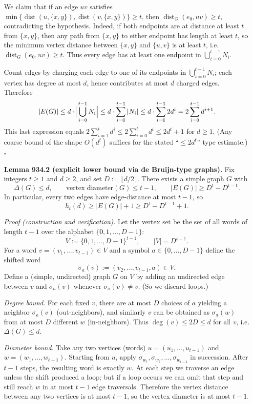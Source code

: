 We claim that if an edge $uv$ satisfies $\min\{\operatorname{dist}(u,\{x,y\}),\operatorname{dist}(v,\{x,y\})\}\ge t$, then $\operatorname{dist}_G(e_0,uv)\ge t$, contradicting the hypothesis.
Indeed, if both endpoints are at distance at least $t$ from $\{x,y\}$, then any path from $\{x,y\}$ to either endpoint has length at least $t$, so the minimum vertex distance between $\{x,y\}$ and $\{u,v\}$ is at least $t$, i.e. $\operatorname{dist}_G(e_0,uv)\ge t$.
Thus every edge has at least one endpoint in $\bigcup_{i=0}^{t-1} N_i$.

Count edges by charging each edge to one of its endpoints in $\bigcup_{i=0}^{t-1} N_i$; each vertex has degree at most $d$, hence contributes at most $d$ charged edges. Therefore
\[
|E(G)|\le d\cdot\Bigl|\bigcup_{i=0}^{t-1} N_i\Bigr|\le d\cdot\sum_{i=0}^{t-1} |N_i|\le d\cdot\sum_{i=0}^{t-1} 2d^i = 2\sum_{i=0}^{t-1} d^{i+1}.
\]
This last expression equals $2\sum_{i=1}^{t} d^{i}\le 2\sum_{i=0}^{t} d^{i}\le 2d^t+1$ for $d\ge 1$.
(Any coarse bound of the shape $O(d^t)$ suffices for the stated ``$\le 2d^t$'' type estimate.)
\hfill$\square$

\medskip
\textbf{Lemma 934.2 (explicit lower bound via de Bruijn-type graphs).}
Fix integers $t\ge 1$ and $d\ge 2$, and set $D:=\lfloor d/2\rfloor$.
There exists a simple graph $G$ with
\[
\Delta(G)\le d,\qquad \text{vertex diameter}(G)\le t-1,\qquad |E(G)|\ge D^t - D^{t-1}.
\]
In particular, every two edges have edge-distance at most $t-1$, so
\[
 h_t(d)\ge |E(G)|+1\ge D^t-D^{t-1}+1.
\]

\emph{Proof (construction and verification).}
Let the vertex set be the set of all words of length $t-1$ over the alphabet $\{0,1,\dots,D-1\}$:
\[
V:=\{0,1,\dots,D-1\}^{t-1},\qquad |V|=D^{t-1}.
\]
For a word $v=(v_1,\dots,v_{t-1})\in V$ and a symbol $a\in\{0,\dots,D-1\}$ define the shifted word
\[
\sigma_a(v):=(v_2,\dots,v_{t-1},a)\in V.
\]
Define a (simple, undirected) graph $G$ on $V$ by adding an undirected edge between $v$ and $\sigma_a(v)$ whenever $\sigma_a(v)\ne v$.
(So we discard loops.)

\emph{Degree bound.}
For each fixed $v$, there are at most $D$ choices of $a$ yielding a neighbor $\sigma_a(v)$ (out-neighbors), and similarly $v$ can be obtained as $\sigma_a(w)$ from at most $D$ different $w$ (in-neighbors).
Thus $\deg(v)\le 2D\le d$ for all $v$, i.e. $\Delta(G)\le d$.

\emph{Diameter bound.}
Take any two vertices (words) $u=(u_1,\dots,u_{t-1})$ and $w=(w_1,\dots,w_{t-1})$.
Starting from $u$, apply $\sigma_{w_1},\sigma_{w_2},\dots,\sigma_{w_{t-1}}$ in succession.
After $t-1$ steps, the resulting word is exactly $w$.
At each step we traverse an edge unless the shift produced a loop; but if a loop occurs we can omit that step and still reach $w$ in at most $t-1$ edge traversals.
Therefore the vertex distance between any two vertices is at most $t-1$, so the vertex diameter is at most $t-1$.

